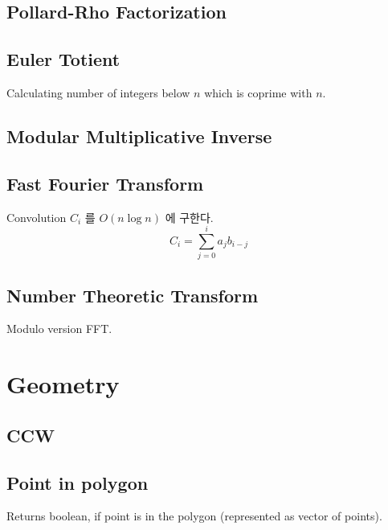 \documentclass[landscape,8pt]{article}
\begin{document}
\begin{multicols}{2}
  \subsection{Pollard-Rho Factorization}
    

  \subsection{Euler Totient}
  Calculating number of integers below $n$ which is coprime with $n$.
    

  \subsection{Modular Multiplicative Inverse}
    


  \subsection{Fast Fourier Transform}
    Convolution $C_i$ 를 $O(n \log n)$ 에 구한다.
    $$C_i = \sum_{j = 0}^{i} a_j b_{i-j}$$
    
  \subsection{Number Theoretic Transform}
    Modulo version FFT.
    
  \columnbreak
\columnbreak
\section{Geometry}
  \subsection{CCW}
    
  \subsection{Point in polygon}
    Returns boolean, if point is in the polygon (represented as vector of points).
    

\end{multicols}
\end{document}
